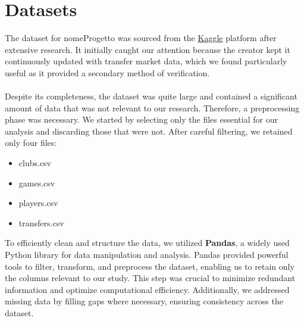 \section{Datasets}
\label{datasets}
The dataset for nomeProgetto was sourced from the \href{https://www.kaggle.com/datasets/davidcariboo/player-scores/data?select=clubs.csv}{Kaggle} platform after extensive research. It initially caught our attention because the creator kept it continuously updated with transfer market data, which we found particularly useful as it provided a secondary method of verification.\\\\
Despite its completeness, the dataset was quite large and contained a significant amount of data that was not relevant to our research.
Therefore, a preprocessing phase was necessary. We started by selecting only the files essential for our analysis and discarding those that were not. After careful filtering, we retained only four files:
\begin{itemize}
    \item clubs.csv
    \item games.csv
    \item players.csv
    \item transfers.csv
\end{itemize}
To efficiently clean and structure the data, we utilized \textbf{Pandas}, a widely used Python library for data manipulation and analysis. Pandas provided powerful tools to filter, transform, and preprocess the dataset, enabling us to retain only the columns relevant to our study. This step was crucial to minimize redundant information and optimize computational efficiency. Additionally, we addressed missing data by filling gaps where necessary, ensuring consistency across the dataset.


